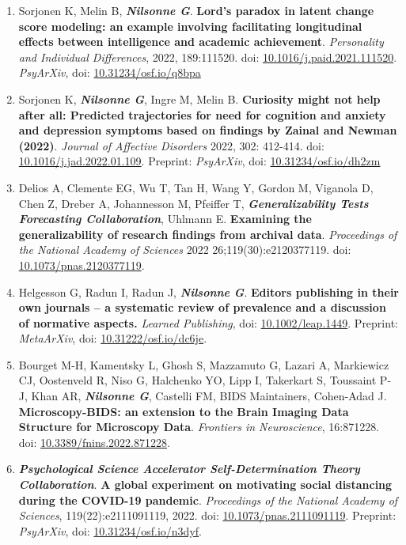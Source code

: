 \documentclass[10pt]{article}
\begin{document}
\begin{enumerate}[nolistsep]
\item Sorjonen K, Melin B, \textbf{\textit{Nilsonne G}}. \textbf{Lord’s paradox in latent change score modeling: an example involving facilitating longitudinal effects between intelligence and academic achievement}. \emph{Personality and Individual Differences}, 2022, 189:111520. doi:  \href{https://doi.org/10.1016/j.paid.2021.111520}{10.1016/j.paid.2021.111520}. \emph{PsyArXiv}, doi:  \href{https://doi.org/10.31234/osf.io/q8bpa}{10.31234/osf.io/q8bpa} 
\item Sorjonen K, \textbf{\textit{Nilsonne G}}, Ingre M, Melin B. \textbf{Curiosity might not help after all: Predicted trajectories for need for cognition and anxiety and depression symptoms based on findings by Zainal and Newman (2022)}. \emph{Journal of Affective Disorders} 2022, 302: 412-414. doi: \href{https://doi.org/10.1016/j.jad.2022.01.109}{10.1016/j.jad.2022.01.109}. Preprint: \emph{PsyArXiv}, doi: \href{https://doi.org/10.31234/osf.io/dh2zm}{10.31234/osf.io/dh2zm}
\item Delios A, Clemente EG, Wu T, Tan H, Wang Y, Gordon M, Viganola D, Chen Z, Dreber A, Johannesson M, Pfeiffer T, \textbf{\textit{Generalizability Tests Forecasting Collaboration}}, Uhlmann E. \textbf{Examining the generalizability of research findings from archival data}. \emph{Proceedings of the National Academy of Sciences} 2022 26;119(30):e2120377119. doi: \href{https://doi.org/10.1073/pnas.2120377119}{10.1073/pnas.2120377119}.
\item Helgesson G, Radun I, Radun J, \textbf{\textit{Nilsonne G}}. \textbf{Editors publishing in their own journals – a systematic review of prevalence and a discussion of normative aspects.} \emph{Learned Publishing}, doi: \href{https://doi.org/10.1002/leap.1449}{10.1002/leap.1449}. Preprint:  \emph{MetaArXiv}, doi: \href{https://doi.org/10.31222/osf.io/dc6je}{10.31222/osf.io/dc6je}.
\item Bourget M-H, Kamentsky L, Ghosh S, Mazzamuto G, Lazari A, Markiewicz CJ, Oostenveld R, Niso G, Halchenko YO, Lipp I, Takerkart S, Toussaint P-J, Khan AR, \textbf{\textit{Nilsonne G}}, Castelli FM, BIDS Maintainers, Cohen-Adad J. \textbf{Microscopy-BIDS: an extension to the Brain Imaging Data Structure for Microscopy Data}. \emph{Frontiers in Neuroscience}, 16:871228. doi: \href{https://doi.org/10.3389/fnins.2022.871228}{10.3389/fnins.2022.871228}.
\item \textbf{\textit{Psychological Science Accelerator Self-Determination Theory Collaboration}}. \textbf{A global experiment on motivating social distancing during the COVID-19 pandemic}. \emph{Proceedings of the National Academy of Sciences}, 119(22):e2111091119, 2022. doi: \href{https://doi.org/10.1073/pnas.2111091119}{10.1073/pnas.2111091119}. Preprint: \emph{PsyArXiv}, doi: \href{https://doi.org/10.31234/osf.io/n3dyf}{10.31234/osf.io/n3dyf}.

\end{enumerate}
\end{document}

